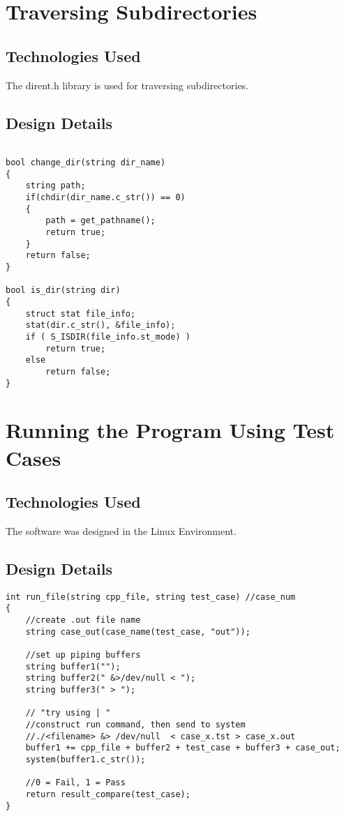 \section{Traversing Subdirectories }

\subsection{Technologies  Used}
The dirent.h library is used for traversing subdirectories.

\subsection{Design Details}

\begin{lstlisting}

bool change_dir(string dir_name)
{
    string path;
    if(chdir(dir_name.c_str()) == 0) 
    {
        path = get_pathname();
        return true;
    }
    return false;
}

bool is_dir(string dir)
{
    struct stat file_info;
    stat(dir.c_str(), &file_info);
    if ( S_ISDIR(file_info.st_mode) ) 
        return true;
    else 
        return false;
}
\end{lstlisting}

\section{Running the Program Using Test Cases }

\subsection{Technologies  Used}
The software was designed in the Linux Environment.


\subsection{Design Details}


\begin{lstlisting}
int run_file(string cpp_file, string test_case) //case_num
{
    //create .out file name
    string case_out(case_name(test_case, "out"));

    //set up piping buffers
    string buffer1("");
    string buffer2(" &>/dev/null < ");
    string buffer3(" > ");

    // "try using | "
    //construct run command, then send to system
    //./<filename> &> /dev/null  < case_x.tst > case_x.out
    buffer1 += cpp_file + buffer2 + test_case + buffer3 + case_out;
    system(buffer1.c_str());

    //0 = Fail, 1 = Pass
    return result_compare(test_case);
}
\end{lstlisting}


